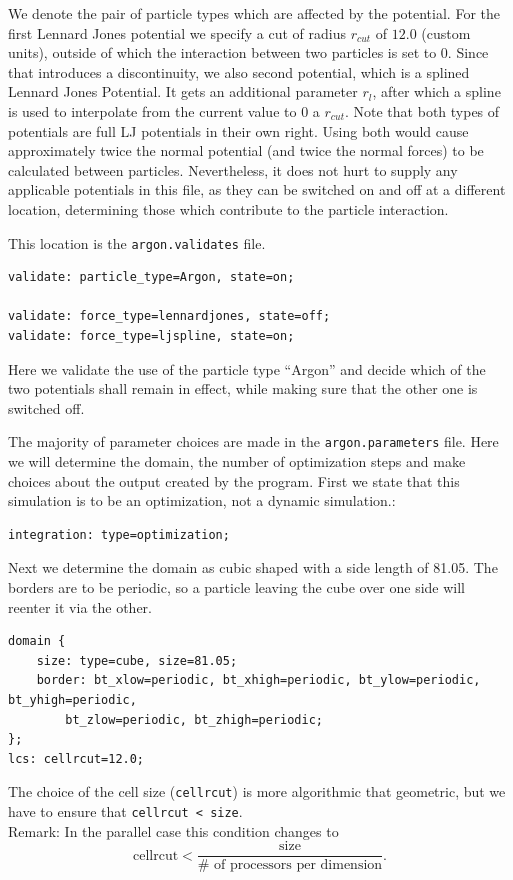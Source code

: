 We denote the pair of particle types which are affected by the potential. For the first Lennard Jones potential we specify a cut of radius $r_{cut}$ of $12.0$ (custom units),
outside of which the interaction between two particles is set to 0. Since that introduces a discontinuity, we also second potential, which is a splined Lennard Jones Potential.
It gets an additional parameter $r_l$, after which a spline is used to interpolate from the current value to 0 a $r_{cut}$.
Note that both types of potentials are full LJ potentials in their own right. Using both would cause approximately twice the normal potential (and twice the normal forces) to be calculated
between particles. Nevertheless, it does not hurt to supply any applicable potentials in this file, as they can be switched on and off at a different location,
determining those which contribute to the particle interaction.

This location is the \texttt{argon.validates} file.
\begin{lstlisting}
validate: particle_type=Argon, state=on;

validate: force_type=lennardjones, state=off;
validate: force_type=ljspline, state=on;
\end{lstlisting}
Here we validate the use of the particle type ``Argon'' and decide which of the two potentials shall remain in effect, while making sure that the other one is switched off.

The majority of parameter choices are made in the \texttt{argon.parameters} file. Here we will determine the domain, the number of optimization steps
and make choices about the output created by the program.
First we state that this simulation is to be an optimization, not a dynamic simulation.:
\begin{lstlisting}
integration: type=optimization;
\end{lstlisting}

Next we determine the domain as cubic shaped with a side length of 81.05. The borders are to be periodic,
so a particle leaving the cube over one side will reenter it via the other.
\begin{lstlisting}
domain {
    size: type=cube, size=81.05;
    border: bt_xlow=periodic, bt_xhigh=periodic, bt_ylow=periodic, bt_yhigh=periodic,
        bt_zlow=periodic, bt_zhigh=periodic;
};
lcs: cellrcut=12.0;
\end{lstlisting}
The choice of the cell size (\texttt{cellrcut}) is more algorithmic that geometric, but we have to ensure that \texttt{cellrcut < size}.\\
Remark: In the parallel case this condition changes to
\texttt{
\begin{equation*}
\text{cellrcut} < \frac{\text{size}}{\# \text{ of processors per dimension}}.
\end{equation*}}

